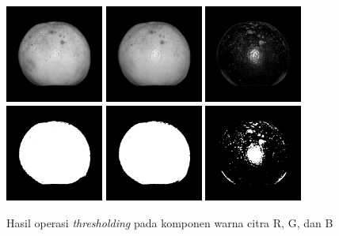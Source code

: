 \documentclass[laporan.tex]{subfiles}
\begin{document}
\begin{figure}[h!]
\centering
\includegraphics[width=3.2cm]{2996r.png} \hskip 0.5cm
\includegraphics[width=3.2cm]{2996g.png} \hskip 0.5cm
\includegraphics[width=3.2cm]{2996b.png}
\vskip 1cm
\includegraphics[width=3.2cm]{2996rt.png} \hskip 0.5cm
\includegraphics[width=3.2cm]{2996gt.png} \hskip 0.5cm
\includegraphics[width=3.2cm]{2996bt.png}
\caption{Hasil operasi \emph{thresholding} pada komponen warna citra R, G, dan B}
\end{figure}
\end{document}
